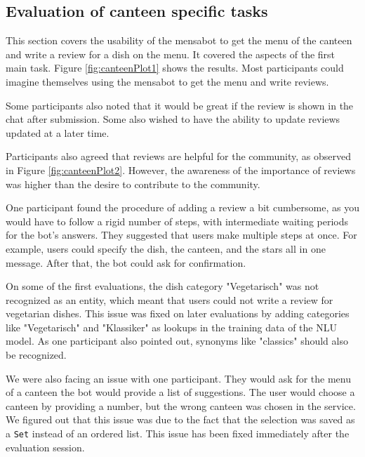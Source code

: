 \subsection{Evaluation of canteen specific tasks}  
This section covers the usability of the mensabot to get the menu of the canteen and write a review for a dish on the menu. It covered the aspects of the first main task. Figure \ref{fig:canteenPlot1} shows the results. Most participants could imagine themselves using the mensabot to get the menu and write reviews.
 
Some participants also noted that it would be great if the review is shown in the chat after submission. Some also wished to have the ability to update reviews updated at a later time.

Participants also agreed that reviews are helpful for the community, as observed in Figure \ref{fig:canteenPlot2}. 
However, the awareness of the importance of reviews was higher than the desire to contribute to the community. 

One participant found the procedure of adding a review a bit cumbersome, as you would have to follow a rigid number of steps, with intermediate waiting periods for the bot's answers. They suggested that users make multiple steps at once. For example, users could specify the dish, the canteen, and the stars all in one message. After that, the bot could ask for confirmation.

On some of the first evaluations, the dish category "Vegetarisch" was not recognized as an entity, which meant that users could not write a review for vegetarian dishes. This issue was fixed on later evaluations by adding categories like "Vegetarisch" and "Klassiker" as lookups in the training data of the NLU model. As one participant also pointed out, synonyms like "classics" should also be recognized.

We were also facing an issue with one participant. They would ask for the menu of a canteen the bot would provide a list of suggestions. The user would choose a  canteen by providing a number, but the wrong canteen was chosen in the service. We figured out that this issue was due to the fact that the selection was saved as a \texttt{Set} instead of an ordered list.
This issue has been fixed immediately after the evaluation session.

